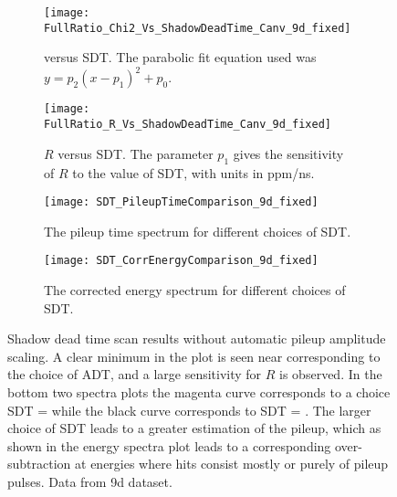 \begin{figure}
\centering
    \begin{subfigure}[t]{0.45\textwidth}
        \centering
        \texttt{[image: FullRatio\_Chi2\_Vs\_ShadowDeadTime\_Canv\_9d\_fixed]}
        \caption{\chisq versus SDT. The parabolic fit equation used was $y = p_{2}(x - p_{1})^{2} + p_{0}.$}
    \end{subfigure}%
    \hspace{1cm}
    \begin{subfigure}[t]{0.45\textwidth}
        \centering
        \texttt{[image: FullRatio\_R\_Vs\_ShadowDeadTime\_Canv\_9d\_fixed]}
        \caption{$R$ versus SDT. The parameter $p_{1}$ gives the sensitivity of $R$ to the value of SDT, with units in ppm/ns.}
    \end{subfigure}

    \begin{subfigure}[t]{0.45\textwidth}
        \centering
        \texttt{[image: SDT\_PileupTimeComparison\_9d\_fixed]}
        \caption{The pileup time spectrum for different choices of SDT.}
    \end{subfigure}%
    \hspace{1cm}
    \begin{subfigure}[t]{0.45\textwidth}
        \centering
        \texttt{[image: SDT\_CorrEnergyComparison\_9d\_fixed]}
        \caption{The corrected energy spectrum for different choices of SDT.}
    \end{subfigure}
\caption[Pileup shadow dead time scan without automatic pileup amplitude scaling]{Shadow dead time scan results without automatic pileup amplitude scaling. A clear minimum in the \chisq plot is seen near  corresponding to the choice of ADT, and a large sensitivity for $R$ is observed. In the bottom two spectra plots the magenta curve corresponds to a choice SDT =  while the black curve corresponds to SDT = . The larger choice of SDT leads to a greater estimation of the pileup, which as shown in the energy spectra plot leads to a corresponding over-subtraction at energies where hits consist mostly or purely of pileup pulses. Data from 9d dataset.}
\label{fig:SDTscan_noScaling}
\end{figure}


